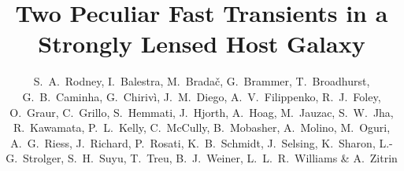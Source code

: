 \title{Two Peculiar Fast Transients in a Strongly Lensed Host Galaxy}


\author{
S.~A.~Rodney,
I.~Balestra,
M.~Brada\v{c},
G.~Brammer,
T.~Broadhurst,
G.~B.~Caminha,
G.~Chiriv{\`i},
J.~M.~Diego,
A.~V.~Filippenko,
R.~J.~Foley,
O.~Graur,
C.~Grillo,
S.~Hemmati,
J.~Hjorth,
A.~Hoag,
M.~Jauzac,
S.~W.~Jha,
R.~Kawamata,
P.~L.~Kelly,
C.~McCully,
B.~Mobasher,
A.~Molino,
M.~Oguri,
A.~G.~Riess,
J.~Richard,
P.~Rosati,
K.~B.~Schmidt,
J.~Selsing,
K.~Sharon,
L.-G.~Strolger,
S.~H.~Suyu,
T.~Treu,
B.~J.~Weiner,
L.~L.~R.~Williams \&
A.~Zitrin
}


